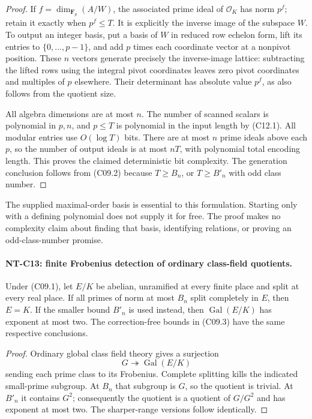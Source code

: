 \begin{proof}
If \(f=\dim_{\mathbf F_p}(A/W)\), the associated prime
ideal of \(\mathcal O_K\) has norm \(p^f\); retain it
exactly when \(p^f\le T\). It is explicitly the inverse
image of the subspace \(W\). To output an integer basis,
put a basis of \(W\) in reduced row echelon form, lift its
entries to \(\{0,\ldots,p-1\}\), and add \(p\) times each
coordinate vector at a nonpivot position. These \(n\)
vectors generate precisely the inverse-image lattice:
subtracting the lifted rows using the integral pivot
coordinates leaves zero pivot coordinates and multiples
of \(p\) elsewhere. Their determinant has absolute value
\(p^f\), as also follows from the quotient size.

All algebra dimensions are at most \(n\). The number of
scanned scalars is polynomial in \(p,n\), and \(p\le T\)
is polynomial in the input length by (C12.1). All modular
entries use \(O(\log T)\) bits. There are at most \(n\)
prime ideals above each \(p\), so the number of output
ideals is at most \(nT\), with polynomial total encoding
length. This proves the claimed deterministic bit
complexity. The generation conclusion follows from
(C09.2) because \(T\ge B_n\), or \(T\ge B'_n\) with
odd class number.
\end{proof}

The supplied maximal-order basis is essential to this
formulation. Starting only with a defining polynomial
does not supply it for free. The proof makes no complexity
claim about finding that basis, identifying relations,
or proving an odd-class-number promise.

\paragraph{NT-C13: finite Frobenius detection of ordinary class-field quotients.}
Under (C09.1), let \(E/K\) be abelian, unramified at every
finite place and split at every real place. If all primes
of norm at most \(B_n\) split completely in \(E\), then
\(E=K\). If the smaller bound \(B'_n\) is used instead,
then \(\operatorname{Gal}(E/K)\) has exponent at most two.
The correction-free bounds in (C09.3) have the same
respective conclusions.

\begin{proof}
Ordinary global class field theory gives a surjection
\[
       G\twoheadrightarrow\operatorname{Gal}(E/K)
\]
sending each prime class to its Frobenius. Complete
splitting kills the indicated small-prime subgroup.
At \(B_n\) that subgroup is \(G\), so the quotient is
trivial. At \(B'_n\) it contains \(G^2\); consequently
the quotient is a quotient of \(G/G^2\) and has exponent
at most two. The sharper-range versions follow identically.
\end{proof}

